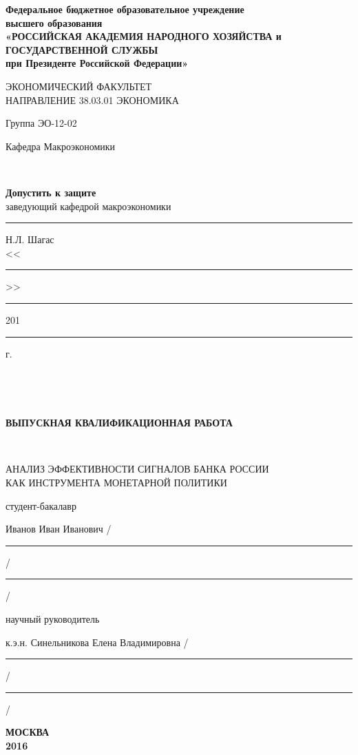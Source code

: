 \documentclass[14pt,a4paper, oneside]{extreport}
\newcounter{notes}
\theoremstyle{plain}              %
\theoremstyle{definition}         %
\begin{document}
    \pagestyle{fancy}
    \renewcommand{\headrulewidth}{0pt}
    \thispagestyle{empty}


\begin{titlepage}
\begin{center}
\small \bfseries Федеральное бюджетное образовательное учреждение \\
высшего образования\\
«РОССИЙСКАЯ АКАДЕМИЯ НАРОДНОГО ХОЗЯЙСТВА и\\
ГОСУДАРСТВЕННОЙ СЛУЖБЫ\\
при Президенте Российской Федерации»

\vspace{2ex}

ЭКОНОМИЧЕСКИЙ ФАКУЛЬТЕТ\\
НАПРАВЛЕНИЕ 38.03.01 ЭКОНОМИКА
\end{center}



\vfill


\noindent\small Группа ЭО-12-02


\hfill\parbox{0.45\linewidth}{
\parbox[t]{20em}{\centering\small
Кафедра Макроэкономики

\mbox{ }

\textbf{Допустить к защите}\\
заведующий кафедрой макроэкономики\\
\rule{8em}{0.5pt} Н.Л. Шагас\\
<<\rule{2em}{0.5pt}>> \rule{5em}{0.5pt} 201\rule{1em}{0.5pt} г. }}

\mbox{ }

\mbox{ }


\begin{center}\bfseries
ВЫПУСКНАЯ КВАЛИФИКАЦИОННАЯ РАБОТА

\mbox{ }

\large АНАЛИЗ ЭФФЕКТИВНОСТИ СИГНАЛОВ БАНКА РОССИИ\\
КАК ИНСТРУМЕНТА МОНЕТАРНОЙ ПОЛИТИКИ

\end{center}

\vfill


\noindent\normalsize
студент-бакалавр

\noindent
Иванов Иван Иванович
\hfill /\rule{6em}{0.5pt}/\rule{6em}{0.5pt}/

\hfill{}

\noindent
научный руководитель 

\noindent
к.э.н. Синельникова Елена Владимировна
\hfill /\rule{6em}{0.5pt}/\rule{6em}{0.5pt}/

\hfill{}



%
%



\vfill
\vfill\vfill
\centering
\normalsize{\textbf{МОСКВА \\ 2016}}
\end{titlepage}
\end{document}
